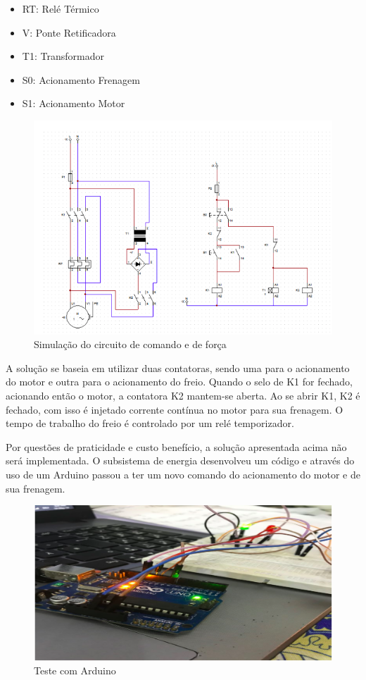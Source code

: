 \begin{itemize}
    \item RT: Relé Térmico
    \item V: Ponte Retificadora
    \item T1: Transformador
    \item S0: Acionamento Frenagem
    \item S1: Acionamento Motor 
\end{itemize}

\begin{figure}[!h]
	\centering
		\includegraphics[scale=0.8]{figuras/energia/17.png}
	\caption{Simulação do circuito de comando e de força}
\end{figure}

A solução se baseia em utilizar duas contatoras, sendo uma para o acionamento do motor e outra para o acionamento do freio. Quando o selo de K1 for fechado, acionando então o motor, a contatora K2 mantem-se aberta. Ao se abrir K1, K2 é fechado, com isso é injetado corrente contínua no motor para sua frenagem. O tempo de trabalho do freio é controlado por um relé temporizador. 

Por questões de praticidade e custo benefício, a solução apresentada acima não será implementada. O subsistema de energia desenvolveu um código e através do uso de um Arduino  passou a ter um novo comando do acionamento do motor e de sua frenagem. 

\begin{figure}[!h]
	\centering
		\includegraphics[scale=0.4]{figuras/energia/18.png}
	\caption{Teste com Arduino}
\end{figure}

